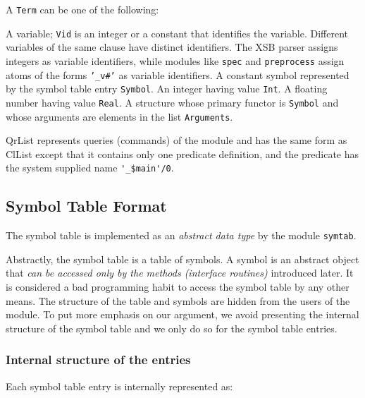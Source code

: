 A {\tt Term} can be one of the following:

\begin{description}
	A variable; {\tt Vid} is an integer or a constant that identifies
	the variable.  Different variables of the same clause have distinct
	identifiers.  The XSB parser assigns integers as variable identifiers,
	while modules like {\tt spec} and {\tt preprocess} assign atoms of
	the forms {\tt '\_v\#'} as variable identifiers.
	A constant symbol represented by the symbol table entry {\tt Symbol}.
	An integer having value {\tt Int}.
	A floating number having value {\tt Real}.
	A structure whose primary functor is {\tt Symbol} and whose
	arguments are elements in the list {\tt Arguments}.
\end{description}

{\sf QrList} represents queries (commands) of the module and has the
same form as {\sf ClList} except that it contains only one predicate
definition, and the predicate has the system supplied name \verb+'_$main'/0+.


\subsection{Symbol Table Format}

The symbol table is implemented as an {\em abstract data type} by the
module {\tt symtab}.

Abstractly, the symbol table is a table of symbols. A symbol
is an abstract object that {\em can be accessed only by the methods
(interface routines)} introduced later.  It is considered a bad
programming habit to access the symbol table by any other means. 
The structure of the table and symbols are hidden from the users
of the module.  To put more emphasis on our argument, we avoid
presenting the internal structure of the symbol table and we only
do so for the symbol table entries.

\subsubsection{Internal structure of the entries}

Each symbol table entry is internally represented as:


